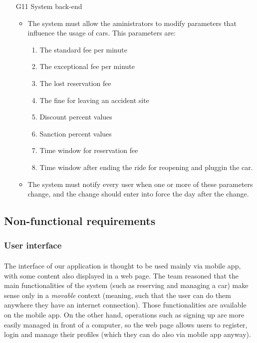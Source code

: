 \begin{itemize}
				\item [G11] System back-end %
					\begin{itemize}
						\item The system must allow the aministrators to modify parameters that influence the usage of cars. This parameters are:
							\begin{enumerate}
								\item The standard fee per minute
								\item The exceptional fee per minute
								\item The lost reservation fee
								\item The fine for leaving an accident site %
								\item Discount percent values
								\item Sanction percent values
								\item Time window for reservation fee
								\item Time window after ending the ride for reopening and pluggin the car.
							\end{enumerate}
						\item The system must notify every user when one or more of these parameters change, and the change should enter into force the day after the change. %
					\end{itemize}
\end{itemize}








\subsection{Non-functional requirements}
	\subsubsection{User interface}
	\paragraph{}The interface of our application is thought to be used mainly via mobile app, with some content also displayed in a web page. The team reasoned that the main functionalities of the system (such as reserving and managing a car) make sense only in a \textit{movable} context (meaning, such that the user can do them anywhere they have an internet connection). Those functionalities are available on the mobile app. On the other hand, operations such as signing up are more easily managed in front of a computer, so the web page allows users to register, login and manage their profiles (which they can do also via mobile app anyway).
